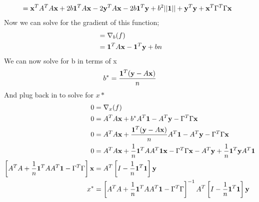 \documentclass[12pt,letterpaper]{hmcpset}
\begin{document}
\begin{solution}
\begin{enumerate}
\begin{align*}
&= {\bf x}^TA^TA{\bf x} +2	b{\bf 1}^TA{\bf x}-2{\bf y}^TA{\bf x}-2b{\bf 1}^T{\bf y}+b^2||{\bf 1}||+{\bf y}^T{\bf y}+{\bf x}^T\Gamma^T\Gamma {\bf x}
\end{align*}
Now we can solve for the gradient of this function; 
\begin{align*}
 &=\nabla_b(f)\\
 &= {\bf 1}^TA{\bf x} -{\bf 1}^T {\bf y}+ bn\\
\end{align*}
We can now solve for b in terms of x
$$ b^* = \frac{{\bf 1}^T({\bf y}-A{\bf x})}{n}$$
And plug back in to solve for $x*$
\begin{align*}
0&= \nabla_x(f)\\
0&=A^TA{\bf x}+b^*A^T{\bf 1}-A^T{\bf y}-\Gamma^T \Gamma {\bf x} \\
0&= A^TA{\bf x}+\frac{{\bf 1}^T({\bf y}-A{\bf x})}{n}A^T{\bf 1}-A^T{\bf y}-\Gamma^T \Gamma {\bf x} \\
0&= A^TA{\bf x}+\frac{1}{n}{\bf 1}^TAA^T{\bf 1}{\bf x}-\Gamma^T\Gamma {\bf x}-A^T {\bf y}+\frac{1}{n}{\bf 1}^T{\bf y} A^T{\bf 1}\\
\left[A^TA+\frac{1}{n}{\bf 1}^TAA^T{\bf 1}-\Gamma^T \Gamma\right] {\bf x} &= A^T \left[ I-\frac{1}{n}{\bf 1}^T{\bf 1} \right]{\bf y}\\
x^*&=\left[A^TA+\frac{1}{n}{\bf 1}^TAA^T{\bf 1}-\Gamma^T \Gamma\right] ^{-1}A^T \left[ I-\frac{1}{n}{\bf 1}^T{\bf 1} \right]{\bf y}
\end{align*}
\end{enumerate}
\end{solution}
\end{document}

